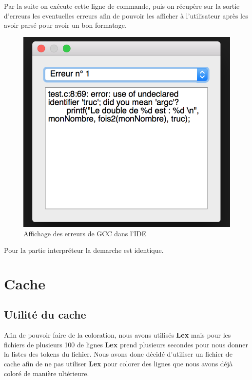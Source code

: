 \documentclass[a4paper,12pt]{article}
\begin{document}
		Par la suite on exécute cette ligne de commande, puis on récupère sur la sortie d'erreurs les eventuelles erreurs afin de pouvoir les afficher à l'utilisateur après les avoir parsé pour avoir un bon formatage.

		\newpage

			\begin{figure}[h!]
				\begin{center}
					\includegraphics[scale=0.7]{imgs/fenErreurEx}
					\caption{Affichage des erreurs de GCC dans l'IDE}
				\end{center}
			\end{figure}

		Pour la partie interpréteur la demarche est identique. 

\section{Cache}

	\subsection{Utilité du cache}

		Afin de pouvoir faire de la coloration, nous avons utilisés \textbf{Lex} mais pour les fichiers de plusieurs 100 de lignes \textbf{Lex} prend plusieurs secondes pour nous donner la listes des tokens du fichier. Nous avons donc décidé d'utiliser un fichier de cache afin de ne pas utiliser \textbf{Lex} pour colorer des lignes que nous avons déjà coloré de manière ultérieure.
\end{document}
